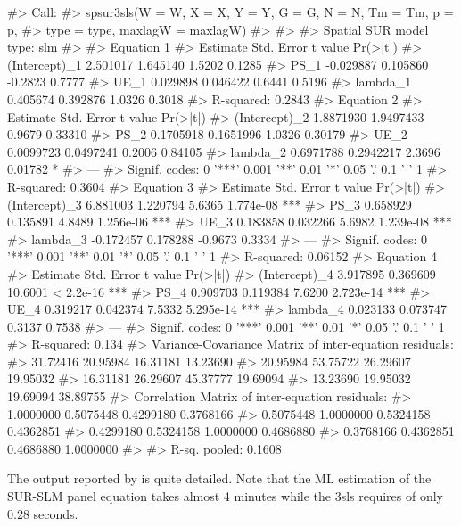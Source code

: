\documentclass[article]{jss}
\begin{document}
\begin{CodeChunk}
\begin{CodeOutput}
#> Call:
#> spsur3sls(W = W, X = X, Y = Y, G = G, N = N, Tm = Tm, p = p, 
#>     type = type, maxlagW = maxlagW)
#> 
#>  
#> Spatial SUR model type:  slm 
#> 
#> Equation  1 
#>                Estimate Std. Error t value Pr(>|t|)
#> (Intercept)_1  2.501017   1.645140  1.5202   0.1285
#> PS_1          -0.029887   0.105860 -0.2823   0.7777
#> UE_1           0.029898   0.046422  0.6441   0.5196
#> lambda_1       0.405674   0.392876  1.0326   0.3018
#> R-squared: 0.2843 
#>   Equation  2 
#>                Estimate Std. Error t value Pr(>|t|)  
#> (Intercept)_2 1.8871930  1.9497433  0.9679  0.33310  
#> PS_2          0.1705918  0.1651996  1.0326  0.30179  
#> UE_2          0.0099723  0.0497241  0.2006  0.84105  
#> lambda_2      0.6971788  0.2942217  2.3696  0.01782 *
#> ---
#> Signif. codes:  0 '***' 0.001 '**' 0.01 '*' 0.05 '.' 0.1 ' ' 1
#> R-squared: 0.3604 
#>   Equation  3 
#>                Estimate Std. Error t value  Pr(>|t|)    
#> (Intercept)_3  6.881003   1.220794  5.6365 1.774e-08 ***
#> PS_3           0.658929   0.135891  4.8489 1.256e-06 ***
#> UE_3           0.183858   0.032266  5.6982 1.239e-08 ***
#> lambda_3      -0.172457   0.178288 -0.9673    0.3334    
#> ---
#> Signif. codes:  0 '***' 0.001 '**' 0.01 '*' 0.05 '.' 0.1 ' ' 1
#> R-squared: 0.06152 
#>   Equation  4 
#>               Estimate Std. Error t value  Pr(>|t|)    
#> (Intercept)_4 3.917895   0.369609 10.6001 < 2.2e-16 ***
#> PS_4          0.909703   0.119384  7.6200 2.723e-14 ***
#> UE_4          0.319217   0.042374  7.5332 5.295e-14 ***
#> lambda_4      0.023133   0.073747  0.3137    0.7538    
#> ---
#> Signif. codes:  0 '***' 0.001 '**' 0.01 '*' 0.05 '.' 0.1 ' ' 1
#> R-squared: 0.134 
#>   Variance-Covariance Matrix of inter-equation residuals:                                    
#>  31.72416 20.95984 16.31181 13.23690
#>  20.95984 53.75722 26.29607 19.95032
#>  16.31181 26.29607 45.37777 19.69094
#>  13.23690 19.95032 19.69094 38.89755
#> Correlation Matrix of inter-equation residuals:                                        
#>  1.0000000 0.5075448 0.4299180 0.3768166
#>  0.5075448 1.0000000 0.5324158 0.4362851
#>  0.4299180 0.5324158 1.0000000 0.4686880
#>  0.3768166 0.4362851 0.4686880 1.0000000
#> 
#>  R-sq. pooled: 0.1608
\end{CodeOutput}
\end{CodeChunk}

The output reported by  is quite detailed. Note that the ML estimation of the SUR-SLM panel equation takes almost 4 minutes while the 3sls requires of only 0.28 seconds.
\end{document}
